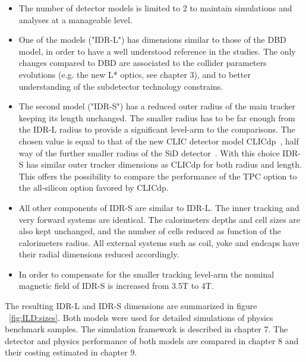 \begin{itemize}
    
\item The number of detector models is limited to 2 to maintain simulations and analyses at a manageable level.

\item One of the models ("IDR-L") has dimensions similar to those of the DBD model, in order to have a well understood reference in the studies. The only changes compared to DBD are associated to the collider parameters evolutions (e.g. the new L* optics, see chapter 3), and to better understanding of the subdetector technology constrains.  

\item The second model ("IDR-S") has a reduced outer radius of the main tracker keeping its length unchanged. The smaller radius has to be far enough from the IDR-L radius to provide a significant level-arm to the comparisons. The chosen value is equal to that of the new CLIC detector model CLICdp~\cite{Arominski:2018uuz}, half way of the further smaller radius of the SiD detector~\cite{ild:bib:ILDDBD}. With this choice IDR-S has similar outer tracker dimensions as CLICdp for both radius and length. This offers the possibility to compare the performance of the TPC option to the all-silicon option favored by CLICdp. 

\item All other components of IDR-S are similar to IDR-L. The inner tracking and very forward systems are identical. The calorimeters depths and cell sizes are also kept unchanged, and the number of cells reduced as function of the calorimeters radius. All external systems such as coil, yoke and endcaps have their radial dimensions reduced accordingly.

\item In order to compensate for the smaller tracking level-arm the nominal magnetic field of IDR-S is increased from 3.5T to 4T.

\end{itemize}

The resulting IDR-L and IDR-S dimensions are summarized in figure ~\ref{fig:ILD:sizes}. Both models were used for detailed simulations of physics benchmark samples. The simulation framework is described in chapter 7. The detector and physics performance of both models are compared in chapter 8 and their costing estimated in chapter 9.

